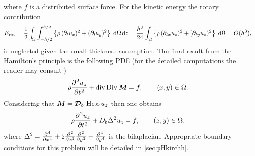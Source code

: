 where $f$ is a distributed surface force. For the kinetic energy the rotary contribution 
\[
E_{\text{rot}} =  \frac{1}{2}  \int_{\Omega} \int_{-h/2}^{h/2} \left\{\rho \, (\partial_t u_x)^2 + (\partial_t u_y)^2 \right\} \d{\Omega} \d{z} = \frac{h^3}{24} \int_{\Omega} \left\{\rho \, (\partial_{tx} u_z)^2 + (\partial_{ty} u_z)^2 \right\} \d{\Omega} = O(h^3),
\]
is neglected given the small thickness assumption. The final result from the Hamilton's principle is the following PDE (for the detailed computations the reader may consult \cite[Chapter 2]{reddy2006theory})
\begin{equation}\label{eq:classKir}
\rho \diffp[2]{u_z}{t} + \div\Div \bm{M} = f, \qquad (x,y) \in \Omega.
\end{equation}
Considering that $\bm{M}= \bm{\mathcal{D}}_b\, \operatorname*{Hess}{u_z}$ then one obtains
\begin{equation*}
\rho \diffp[2]{u_z}{t} + D_b \Delta^2 u_z = f, \qquad (x,y) \in \Omega.
\end{equation*}
where $\Delta^2 = \diffp[4]{}{x} + 2\diffp[2]{}{x}\diffp[2]{}{y} + \diffp[4]{}{y}$ is the bilaplacian. Appropriate boundary conditions for this problem will be detailed in \ref{sec:pHkirchh}.


